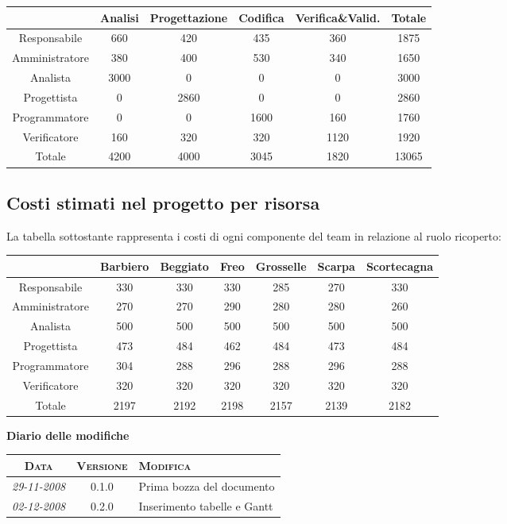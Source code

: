 \documentclass[11pt,a4paper]{article}
\newcommand{\modifiche} 
{
\newpage
\begin{center}
\textbf{Diario delle modifiche} \\
\bigskip
\begin{tabular}{|c|c|p{0.69\textwidth}|}
\hline
\textsc{Data} & \textsc{Versione} & \textsc{Modifica} \\
\hline
\hline
\textit{29-11-2008} & 0.1.0 & Prima bozza del documento \\
\hline
\hline
\textit{02-12-2008} & 0.2.0 & Inserimento tabelle e Gantt \\
\hline
\end{tabular}
\end{center}
}
\begin{document}
\begin{tabular}{|c|c|c|c|c|c|}
\hline
 & Analisi & Progettazione & Codifica & Verifica\&Valid. & Totale \\ \hline
Responsabile & 660 & 420 & 435 & 360 & 1875 \\ \hline
Amministratore & 380 & 400 & 530 & 340 & 1650 \\ \hline
Analista & 3000 & 0 & 0 & 0 & 3000 \\ \hline
Progettista & 0 & 2860 & 0 & 0 & 2860 \\ \hline
Programmatore & 0 & 0 & 1600 & 160 & 1760 \\ \hline
Verificatore & 160 & 320 & 320 & 1120 & 1920 \\ \hline
Totale & 4200 & 4000 & 3045 & 1820 & 13065 \\ \hline
\end{tabular}

\subsection{Costi stimati nel progetto per risorsa}
La tabella sottostante rappresenta i costi di ogni componente del team in relazione al ruolo ricoperto:\\

\begin{tabular}{|c|c|c|c|c|c|c|}
\hline
\multicolumn{1}{|l|}{} & \multicolumn{1}{l|}{        Barbiero} & \multicolumn{1}{l|}{          Beggiato} & \multicolumn{1}{l|}{              Freo} & \multicolumn{1}{l|}{               Grosselle} & \multicolumn{1}{l|}{          Scarpa} & \multicolumn{1}{l|}{  Scortecagna} \\ \hline
Responsabile & 330 & 330 & 330 & 285 & 270 & 330 \\ \hline
Amministratore & 270 & 270 & 290 & 280 & 280 & 260 \\ \hline
Analista & 500 & 500 & 500 & 500 & 500 & 500 \\ \hline
Progettista & 473 & 484 & 462 & 484 & 473 & 484 \\ \hline
Programmatore & 304 & 288 & 296 & 288 & 296 & 288 \\ \hline
Verificatore & 320 & 320 & 320 & 320 & 320 & 320 \\ \hline
Totale & 2197 & 2192 & 2198 & 2157 & 2139 & 2182 \\ \hline
\end{tabular}
\modifiche
\end{document}
